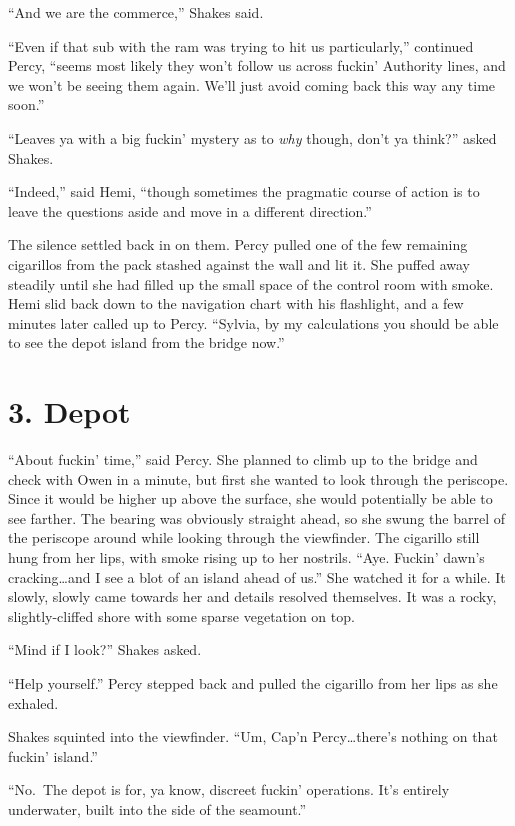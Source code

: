 \documentclass[
]{scrbook}
\begin{document}
``And we are the commerce,'' Shakes said.

``Even if that sub with the ram was trying to hit us particularly,''
continued Percy, ``seems most likely they won't follow us across fuckin'
Authority lines, and we won't be seeing them again. We'll just avoid
coming back this way any time soon.''

``Leaves ya with a big fuckin' mystery as to \emph{why} though, don't ya
think?'' asked Shakes.

``Indeed,'' said Hemi, ``though sometimes the pragmatic course of action
is to leave the questions aside and move in a different direction.''

The silence settled back in on them. Percy pulled one of the few
remaining cigarillos from the pack stashed against the wall and lit it.
She puffed away steadily until she had filled up the small space of the
control room with smoke. Hemi slid back down to the navigation chart
with his flashlight, and a few minutes later called up to Percy.
``Sylvia, by my calculations you should be able to see the depot island
from the bridge now.''

\newpage

\hypertarget{depot}{%
\section{3. Depot}\label{depot}}

``About fuckin' time,'' said Percy. She planned to climb up to the
bridge and check with Owen in a minute, but first she wanted to look
through the periscope. Since it would be higher up above the surface,
she would potentially be able to see farther. The bearing was obviously
straight ahead, so she swung the barrel of the periscope around while
looking through the viewfinder. The cigarillo still hung from her lips,
with smoke rising up to her nostrils. ``Aye. Fuckin' dawn's
cracking\ldots and I see a blot of an island ahead of us.'' She watched
it for a while. It slowly, slowly came towards her and details resolved
themselves. It was a rocky, slightly-cliffed shore with some sparse
vegetation on top.

``Mind if I look?'' Shakes asked.

``Help yourself.'' Percy stepped back and pulled the cigarillo from her
lips as she exhaled.

Shakes squinted into the viewfinder. ``Um, Cap'n
Percy\ldots there's nothing on that fuckin' island.''

``No.~The depot is for, ya know, discreet fuckin' operations. It's
entirely underwater, built into the side of the seamount.''
\end{document}
